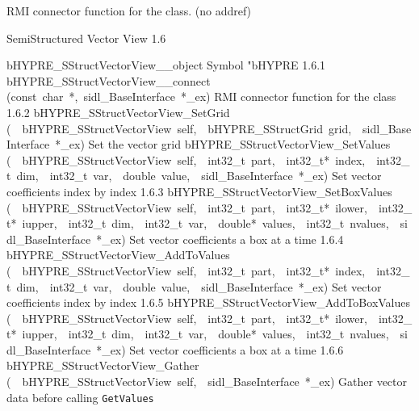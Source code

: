 \documentclass{article}
\begin{document}
\begin{cxxentry}
\begin{cxxentry}
\begin{cxxvariable}
\begin{cxxdoc}
RMI connector function for the class. (no addref)
\end{cxxdoc}
\end{cxxvariable}
\end{cxxentry}
\begin{cxxentry}
{}
        {SemiStructured Vector View}
        {}
        {
}
        {1.6}
\begin{cxxnames}
        {bHYPRE\_SStructVectorView\_\_object}
        {}
        {
Symbol "bHYPRE}
        {1.6.1}
        {bHYPRE\_SStructVectorView\_\_connect}
        {(const\ char\ *,\ sidl\_BaseInterface\ *\_ex)}
        {
RMI connector function for the class}
        {1.6.2}
        {bHYPRE\_SStructVectorView\_SetGrid}
        {(\ \ bHYPRE\_SStructVectorView\ self,\ \ bHYPRE\_SStructGrid\ grid,\ \ sidl\_BaseInterface\ *\_ex)}
        {
Set the vector grid}
        {}
\label{cxx.1.6.11}
        {bHYPRE\_SStructVectorView\_SetValues}
        {(\ \ bHYPRE\_SStructVectorView\ self,\ \ int32\_t\ part,\ \ int32\_t*\ index,\ \ int32\_t\ dim,\ \ int32\_t\ var,\ \ double\ value,\ \ sidl\_BaseInterface\ *\_ex)}
        {
Set vector coefficients index by index}
        {1.6.3}
        {bHYPRE\_SStructVectorView\_SetBoxValues}
        {(\ \ bHYPRE\_SStructVectorView\ self,\ \ int32\_t\ part,\ \ int32\_t*\ ilower,\ \ int32\_t*\ iupper,\ \ int32\_t\ dim,\ \ int32\_t\ var,\ \ double*\ values,\ \ int32\_t\ nvalues,\ \ sidl\_BaseInterface\ *\_ex)}
        {
Set vector coefficients a box at a time}
        {1.6.4}
        {bHYPRE\_SStructVectorView\_AddToValues}
        {(\ \ bHYPRE\_SStructVectorView\ self,\ \ int32\_t\ part,\ \ int32\_t*\ index,\ \ int32\_t\ dim,\ \ int32\_t\ var,\ \ double\ value,\ \ sidl\_BaseInterface\ *\_ex)}
        {
Set vector coefficients index by index}
        {1.6.5}
        {bHYPRE\_SStructVectorView\_AddToBoxValues}
        {(\ \ bHYPRE\_SStructVectorView\ self,\ \ int32\_t\ part,\ \ int32\_t*\ ilower,\ \ int32\_t*\ iupper,\ \ int32\_t\ dim,\ \ int32\_t\ var,\ \ double*\ values,\ \ int32\_t\ nvalues,\ \ sidl\_BaseInterface\ *\_ex)}
        {
Set vector coefficients a box at a time}
        {1.6.6}
        {bHYPRE\_SStructVectorView\_Gather}
        {(\ \ bHYPRE\_SStructVectorView\ self,\ \ sidl\_BaseInterface\ *\_ex)}
        {
Gather vector data before calling {\tt GetValues}}

\end{cxxnames}
\end{cxxentry}
\end{cxxentry}
\end{document}
